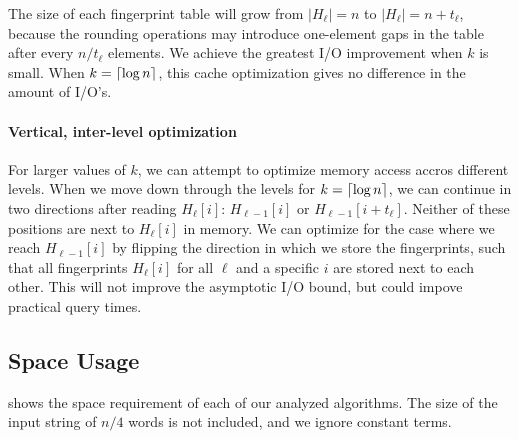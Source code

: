 \documentclass[a4]{article}
\newcommand*{\pref}{\prettyref}
\begin{document}
The size of each fingerprint table will grow from $|H_\ell| = n$ to $|H_\ell| = n+t_\ell$, because the rounding operations may introduce one-element gaps in the table after every $n/t_\ell$ elements. We achieve the greatest I/O improvement when $k$ is small. When $k=\lceil\log n\rceil$, this cache optimization gives no difference in the amount of I/O's.

\paragraph{Vertical, inter-level optimization}

For larger values of $k$, we can attempt to optimize memory access accros different levels. When we move down through the levels for $k=\lceil\log n\rceil$, we can continue in two directions after reading $H_\ell[i]$: $H_{\ell-1}[i]$ or $H_{\ell-1}[i+t_\ell]$. Neither of these positions are next to $H_\ell[i]$ in memory. We can optimize for the case where we reach $H_{\ell-1}[i]$ by flipping the direction in which we store the fingerprints, such that all fingerprints $H_\ell[i]$ for all $\ell$ and a specific $i$ are stored next to each other. This will not improve the asymptotic I/O bound, but could impove practical query times.

\subsection{Space Usage}

\pref{tab:algorithms-space} shows the space requirement of each of our analyzed algorithms. The size of the input string of $n/4$ words is not included, and we ignore constant terms.
\end{document}
